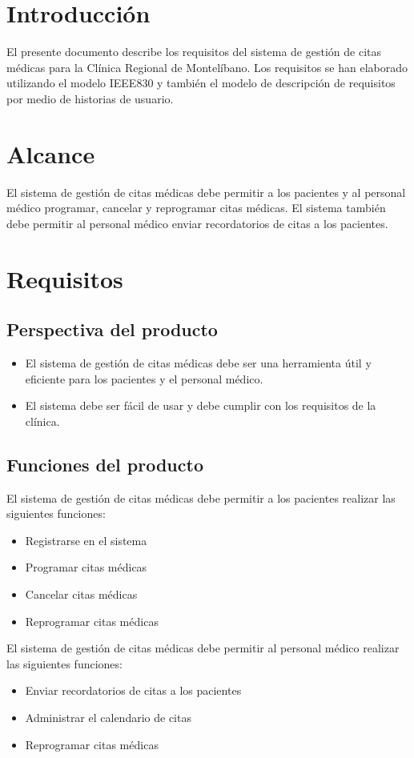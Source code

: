 \documentclass{article}
\theoremstyle{mytheoremstyle}
\theoremstyle{mytheoremstyle}
\theoremstyle{myproblemstyle}
\begin{document}
\section{Introducción}

El presente documento describe los requisitos del sistema de gestión de citas médicas para la Clínica Regional de Montelíbano. Los requisitos se han elaborado utilizando el modelo IEEE830 y también el modelo de descripción de requisitos por medio de historias de usuario.

\section{Alcance}

El sistema de gestión de citas médicas debe permitir a los pacientes y al personal médico programar, cancelar y reprogramar citas médicas. El sistema también debe permitir al personal médico enviar recordatorios de citas a los pacientes.

\section{Requisitos}

\subsection{Perspectiva del producto}
\begin{itemize}
\item El sistema de gestión de citas médicas debe ser una herramienta útil y eficiente para los pacientes y el personal médico. 
\item El sistema debe ser fácil de usar y debe cumplir con los requisitos de la clínica.
\end{itemize}


\subsection{Funciones del producto}
El sistema de gestión de citas médicas debe permitir a los pacientes realizar las siguientes funciones:
\begin{itemize}
\item Registrarse en el sistema
\item Programar citas médicas
\item Cancelar citas médicas
\item Reprogramar citas médicas
\end{itemize}
El sistema de gestión de citas médicas debe permitir al personal médico realizar las siguientes funciones:
\begin{itemize}
\item Enviar recordatorios de citas a los pacientes
\item Administrar el calendario de citas
\item Reprogramar citas médicas
\end{itemize}
\end{document}
